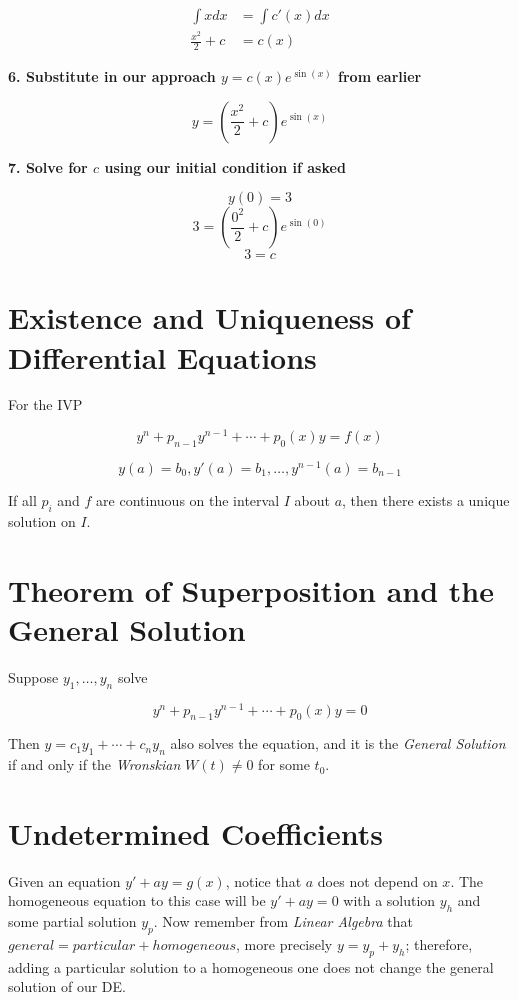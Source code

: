 \begin{align*}
    \int x dx         & = \int c'(x)dx \\
    \frac{x^2}{2} + c & = c(x)
\end{align*}

\textbf{6. Substitute in our approach \(y = c(x)e^{\sin(x)}\) from earlier}

\[
    y = \left(\frac{x^2}{2} + c\right)e^{\sin(x)}
\]

\textbf{7. Solve for \(c\) using our initial condition if asked}

\[
    y(0) = 3
\]
\[
    3 = \left(\frac{0^2}{2} + c\right)e^{\sin(0)}
\]
\[
    3 = c
\]

\section{Existence and Uniqueness of Differential Equations}

For the IVP

\[
    y^{n} + p_{n - 1}y^{n - 1}+ \cdots + p_0 (x)y = f(x)
\]

\[
    y(a) = b_0, y'(a) = b_1, \dots, y^{n - 1}(a) = b_{n - 1}
\]

If all \(p_i\) and \(f\) are continuous on the interval \(I\) about \(a\), then
there exists a unique solution on \(I\).

\section{Theorem of Superposition and the General Solution}

Suppose \(y_1, \dots, y_n\) solve

\[
    y^{n} + p_{n - 1}y^{n - 1}+ \cdots + p_0 (x)y = 0
\]

Then \(y = c_1 y_1 + \cdots + c_n y_n\) also solves the equation, and it is the
\emph{General Solution} if and only if the \emph{Wronskian} \(W(t) \ne 0\) for some \(t_0\).

\section{Undetermined Coefficients}

Given an equation \(y' + ay = g(x)\), notice that \(a\) does not depend on \(x\).
The homogeneous equation to this case will be \(y' + ay = 0\) with a solution \(y_h\) and some
partial solution \(y_p\). Now remember from \emph{Linear Algebra} that
\(general = particular + homogeneous\), more precisely \(y = y_p + y_h\); therefore, adding a
particular solution to a homogeneous one does not change
the general solution of our DE.

